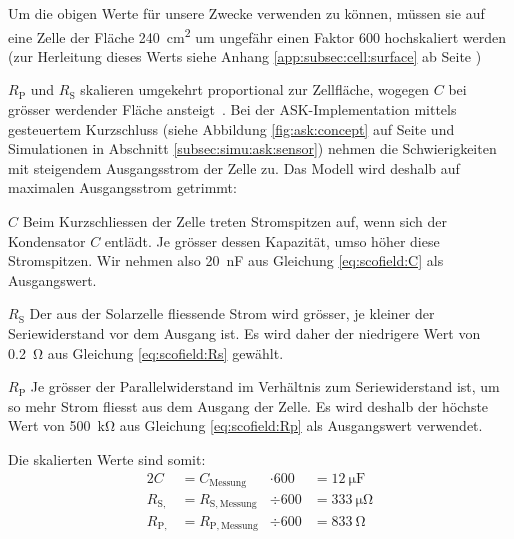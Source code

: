 Um die  obigen Werte f\"ur unsere  Zwecke verwenden zu k\"onnen,  m\"ussen sie
auf eine Zelle der Fl\"ache \SI{240}{\centi\meter\squared} um ungef\"ahr einen
Faktor \num{600} hochskaliert werden (zur Herleitung dieses Werts siehe Anhang
\ref{app:subsec:cell:surface} ab Seite \pageref{app:subsec:cell:surface})

$R_{\mathrm{P}}$   und  $R_{\mathrm{S}}$   skalieren  umgekehrt   proportional
zur   Zellfl\"ache,    wogegen   $C$   bei   gr\"osser    werdender   Fl\"ache
ansteigt~\cite{ref:solar:scofield}. Bei    der   ASK-Implementation    mittels
gesteuertem   Kurzschluss    (siehe   Abbildung    \ref{fig:ask:concept}   auf
Seite    \pageref{fig:ask:concept}     und    Simulationen     in    Abschnitt
\ref{subsec:simu:ask:sensor})  nehmen   die  Schwierigkeiten   mit  steigendem
Ausgangsstrom   der  Zelle   zu. Das   Modell  wird   deshalb  auf   maximalen
Ausgangsstrom getrimmt:

\begin{symbols}
    \firmlist
    \item[$C$]
        Beim Kurzschliessen der  Zelle treten Stromspitzen auf,  wenn sich der
        Kondensator  $C$  entl\"adt. Je  gr\"osser  dessen  Kapazit\"at,  umso
        h\"oher diese Stromspitzen.  Wir  nehmen also \SI{20}{\nano\farad} aus
        Gleichung \ref{eq:scofield:C} als Ausgangswert.
    \item[$R_{\mathrm{S}}$]
        Der aus der Solarzelle fliessende Strom wird gr\"osser, je kleiner der
        Seriewiderstand vor dem Ausgang ist. Es wird daher der niedrigere Wert
        von \SI{0.2}{\ohm} aus Gleichung \ref{eq:scofield:Rs} gew\"ahlt.
    \item[$R_{\mathrm{P}}$]
        Je    gr\"osser   der    Parallelwiderstand   im    Verh\"altnis   zum
        Seriewiderstand  ist, um  so mehr  Strom fliesst  aus dem  Ausgang der
        Zelle.  Es wird deshalb der h\"ochste Wert von \SI{500}{\kilo\ohm} aus
        Gleichung \ref{eq:scofield:Rp} als Ausgangswert verwendet.
\end{symbols}

Die skalierten Werte sind somit:
\begin{alignat}{2}
    C               &= C_{\mathrm{Messung}}    &\cdot 600 &= \SI{12}{\micro\farad} \\
    R_{\mathrm{S,}} &= R_{\mathrm{S, Messung}} &\div  600 &= \SI{333}{\micro\ohm}    \\
    R_{\mathrm{P,}} &= R_{\mathrm{P, Messung}} &\div  600 &= \SI{833}{\ohm}
\end{alignat}

